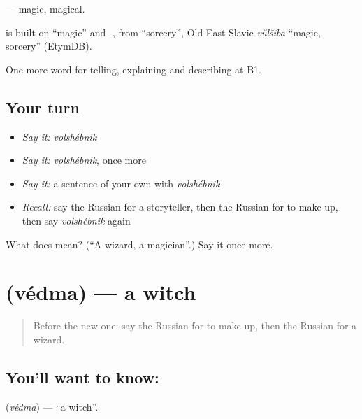 \emph{} — magic, magical.

\begin{cousinweb}
\emph{} is built on \emph{} \textquotedblleft{}magic\textquotedblright{} and \emph{-}, from \emph{} \textquotedblleft{}sorcery\textquotedblright{}, Old East Slavic \emph{vŭlšĭba} \textquotedblleft{}magic, sorcery\textquotedblright{} (EtymDB).
\end{cousinweb}

\begin{grammarlens}[title={What you've built}]
One more word for telling, explaining and describing at B1.
\end{grammarlens}

\subsection*{Your turn}
\begin{itemize}
\raggedright
  \item \emph{Say it:} \emph{volshébnik}
  \item \emph{Say it:} \emph{volshébnik}, once more
  \item \emph{Say it:} a sentence of your own with \emph{volshébnik}
  \item \emph{Recall:} say the Russian for a storyteller, then the Russian for to make up, then say \emph{volshébnik} again
\end{itemize}

\begin{tcolorbox}[breakable,colback=teal!4,colframe=teal!35!black,title={Before you move on}]
What does  mean? (\textquotedblleft{}A wizard, a magician\textquotedblright{}.) Say it once more.
\end{tcolorbox}
\section[\texorpdfstring{\ru{ведьма} (védma)}{ведьма (védma)}]{ (védma) — a witch}

\label{lesson:RU-C320-vedma}



\begin{quote}
Before the new one: say the Russian for to make up, then the Russian for a wizard.
\end{quote}

\subsection*{You'll want to know: }
\textbf{} (\emph{védma}) — \textquotedblleft{}a witch\textquotedblright{}.


